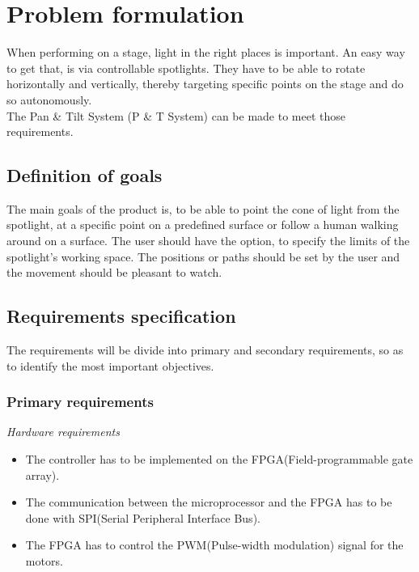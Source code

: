 \newpage

\section{Problem formulation}

When performing on a stage, light in the right places is important. An easy way to get that, is via controllable spotlights. They have to be able to rotate horizontally and vertically, thereby targeting specific points on the stage and do so autonomously.\\
The Pan \& Tilt System (P \& T System) can be made to meet those requirements.


\subsection{Definition of goals}
The main goals of the product is, to be able to point the cone of light from the spotlight, at a specific point on a predefined surface or follow a human walking around on a surface. The user should have the option, to specify the limits of the spotlight's working space. The positions or paths should be set by the user and the movement should be pleasant to watch.


\subsection{Requirements specification}
\label{sec:RequirementsSpecification}

The requirements will be divide into primary and secondary requirements, so as to identify the most important objectives.


\subsubsection{Primary requirements}

\textit{Hardware requirements}

\begin{itemize}

\item The controller has to be implemented on the FPGA(Field-programmable gate array).

\item The communication between the microprocessor and the FPGA has to be done with SPI(Serial Peripheral Interface Bus).

\item The FPGA has to control the PWM(Pulse-width modulation) signal for the motors.
\end{itemize}


